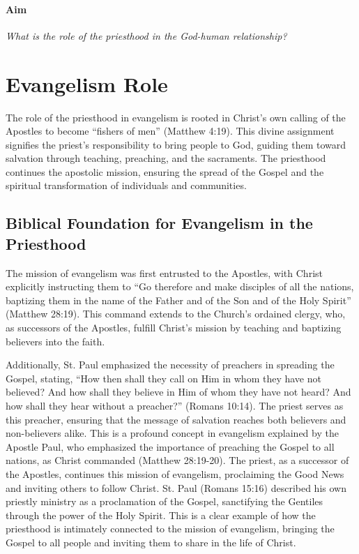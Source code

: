 \documentclass[12pt,doc]{apa7}   	%
\begin{document}
\vskip 0.5cm
\paragraph{Aim}  \emph{What is the role of the priesthood in the God-human relationship?}



\section{Evangelism Role}\label{evangelism}
The role of the priesthood in evangelism is rooted in Christ’s own calling of the Apostles to become “fishers of men” (Matthew 4:19). This divine assignment signifies the priest’s responsibility to bring people to God, guiding them toward salvation through teaching, preaching, and the sacraments. The priesthood continues the apostolic mission, ensuring the spread of the Gospel and the spiritual transformation of individuals and communities.

\subsection{Biblical Foundation for Evangelism in the Priesthood}

The mission of evangelism was first entrusted to the Apostles, with Christ explicitly instructing them to “Go therefore and make disciples of all the nations, baptizing them in the name of the Father and of the Son and of the Holy Spirit” (Matthew 28:19). This command extends to the Church’s ordained clergy, who, as successors of the Apostles, fulfill Christ’s mission by teaching and baptizing believers into the faith.

Additionally, St. Paul emphasized the necessity of preachers in spreading the Gospel, stating, “How then shall they call on Him in whom they have not believed? And how shall they believe in Him of whom they have not heard? And how shall they hear without a preacher?” (Romans 10:14). The priest serves as this preacher, ensuring that the message of salvation reaches both believers and non-believers alike.  This is a profound concept in evangelism explained by the Apostle Paul, who emphasized the importance of preaching the Gospel to all nations, as Christ commanded (Matthew 28:19-20).  The priest, as a successor of the Apostles, continues this mission of evangelism, proclaiming the Good News and inviting others to follow Christ.  St. Paul (Romans 15:16) described his own priestly ministry as a proclamation of the Gospel, sanctifying the Gentiles through the power of the Holy Spirit.  This is a clear example of how the priesthood is intimately connected to the mission of evangelism, bringing the Gospel to all people and inviting them to share in the life of Christ.
\end{document}
